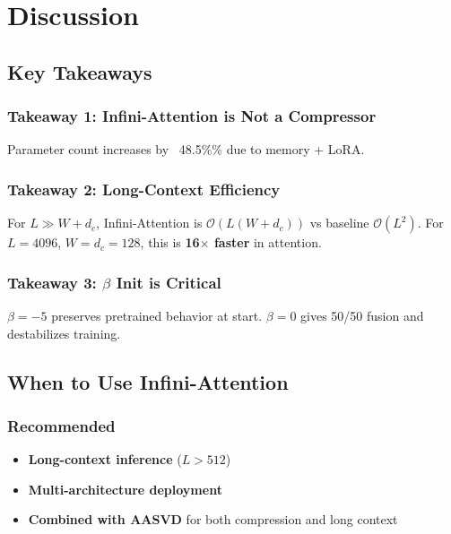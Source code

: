 
\section{Discussion}

\subsection{Key Takeaways}

\subsubsection{Takeaway 1: Infini-Attention is Not a Compressor}

Parameter count increases by ~48.5\%\% due to memory + LoRA.

\subsubsection{Takeaway 2: Long-Context Efficiency}

For $L \gg W + d_c$, Infini-Attention is $\mathcal{O}(L(W + d_c))$ vs 
baseline $\mathcal{O}(L^2)$. For $L = 4096$, $W = d_c = 128$, this is 
\textbf{16$\times$ faster} in attention.

\subsubsection{Takeaway 3: $\beta$ Init is Critical}

$\beta = -5$ preserves pretrained behavior at start. $\beta = 0$ gives 
50/50 fusion and destabilizes training.

\subsection{When to Use Infini-Attention}

\subsubsection{Recommended}

\begin{itemize}
\item \textbf{Long-context inference} ($L > 512$)
\item \textbf{Multi-architecture deployment}
\item \textbf{Combined with AASVD} for both compression and long context

\end{itemize}

